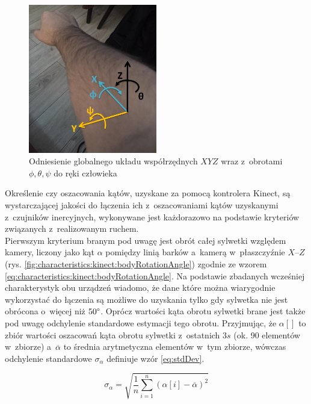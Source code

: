 \begin{savenotes}
	\begin{figure}[h]
		\centering	
		\includegraphics[width=0.5\textwidth]{images/handAxes.jpg}	
		\caption{Odniesienie globalnego układu współrzędnych $XYZ$ wraz z~obrotami $\phi , \theta , \psi$ do ręki człowieka}
		\label{fig:handAxes}
	\end{figure}
\end{savenotes}
												
Określenie czy oszacowania kątów, uzyskane za pomocą kontrolera Kinect, są wystarczającej jakości do łączenia ich z~oszacowaniami kątów uzyskanymi z~czujników inercyjnych, wykonywane jest każdorazowo na podstawie kryteriów związanych z~realizowanym ruchem. \\
Pierwszym kryterium branym pod uwagę jest obrót całej sylwetki względem kamery, liczony jako kąt $\alpha$ pomiędzy linią barków a~kamerą w~płaszczyźnie $X$--$Z$ (rys. \ref{fig:characteristics:kinect:bodyRotationAngle}) zgodnie ze wzorem \ref{eq:characteristics:kinect:bodyRotationAngle}. Na podstawie zbadanych wcześniej charakterystyk obu urządzeń wiadomo, że dane które można wiarygodnie wykorzystać do łączenia są możliwe do uzyskania tylko gdy sylwetka nie jest obrócona o~więcej niż $50\degree$. Oprócz wartości kąta obrotu sylwetki brane jest także pod uwagę odchylenie standardowe estymacji tego obrotu. Przyjmując, że $\alpha[]$ to zbiór wartości oszacowań kąta obrotu sylwetki z~ostatnich $3s$ (ok. 90 elementów w~zbiorze) a~$\overline{\alpha}$ to średnia arytmetyczna elementów w~tym zbiorze, wówczas odchylenie standardowe $\sigma_\alpha$ definiuje wzór \ref{eq:stdDev}.
												
\begin{equation}
	\sigma_\alpha = \sqrt{\frac{1}{n}\sum_{i=1}^{n}{(\alpha[i] - \overline{\alpha})^2}}
	\label{eq:stdDev}
\end{equation}
												
